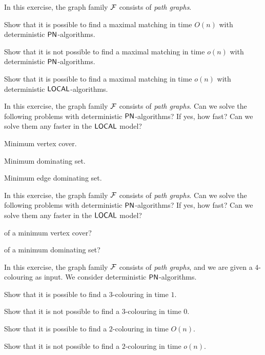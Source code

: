\begin{ex}
    In this exercise, the graph family $\mathcal{F}$ consists of \emph{path graphs}.
    \begin{subex}
        \item Show that it is possible to find a maximal matching in time $O(n)$ with deterministic $\textup{\sffamily PN}$-algorithms.
        \item Show that it is not possible to find a maximal matching in time $o(n)$ with deterministic $\textup{\sffamily PN}$-algorithms.
        \item Show that it is possible to find a maximal matching in time $o(n)$ with deterministic $\textup{\sffamily LOCAL}$-algorithms.
    \end{subex}
\end{ex}

\begin{ex}[optimisation]
    In this exercise, the graph family $\mathcal{F}$ consists of \emph{path graphs}. Can we solve the following problems with deterministic $\textup{\sffamily PN}$-algorithms? If yes, how fast? Can we solve them any faster in the $\textup{\sffamily LOCAL}$ model?
    \begin{subex}
        \item Minimum vertex cover.
        \item Minimum dominating set.
        \item Minimum edge dominating set.
    \end{subex}
\end{ex}

\begin{ex}[approximation]
    In this exercise, the graph family $\mathcal{F}$ consists of \emph{path graphs}. Can we solve the following problems with deterministic $\textup{\sffamily PN}$-algorithms? If yes, how fast? Can we solve them any faster in the $\textup{\sffamily LOCAL}$ model?
    \begin{subex}
        \item {} of a minimum vertex cover?
        \item {} of a minimum dominating set?
    \end{subex}
\end{ex}

\begin{ex}
    In this exercise, the graph family $\mathcal{F}$ consists of \emph{path graphs}, and we are given a $4$-colouring as input. We consider deterministic $\textup{\sffamily PN}$-algorithms.
    \begin{subex}
        \item Show that it is possible to find a $3$-colouring in time $1$.
        \item Show that it is not possible to find a $3$-colouring in time $0$.
        \item Show that it is possible to find a $2$-colouring in time $O(n)$.
        \item Show that it is not possible to find a $2$-colouring in time $o(n)$.
    \end{subex}
\end{ex}

